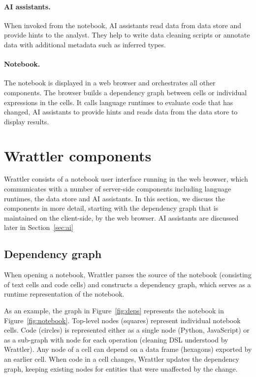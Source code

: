 \documentclass[sigplan,preprint,10pt]{acmart}\settopmatter{printfolios=true,printccs=false,printacmref=false}
\theoremstyle{plain}
\theoremstyle{definition}
\begin{document}
\paragraph{AI assistants.} When invoked from the notebook, AI assistants read data
from data store and provide hints to the analyst. They help to write data cleaning
scripts or annotate data with additional metadata such as inferred types.

\paragraph{Notebook.} The notebook is displayed in a web browser and orchestrates 
all other components. The browser builds a dependency graph between cells or individual 
expressions in the cells. It calls language runtimes to evaluate code that has changed,
AI assistants to provide hints and reads data from the data store to display results.  

\section{Wrattler components}
\label{sec:wrattler}

Wrattler consists of a notebook user interface running in the web browser, which communicates with 
a number of server-side components including language runtimes, the data store and AI assistants. 
In this section, we discuss the components in more detail, starting with the dependency graph
that is maintained on the client-side, by the web browser. AI assistants are discussed later
in Section~\ref{sec:ai}

\subsection{Dependency graph}

When opening a notebook, Wrattler parses the source of the notebook (consisting of text cells and 
code cells) and constructs a dependency graph, which serves as a runtime representation of the
notebook. 

As an example, the graph in Figure~\ref{fig:deps} represents the notebook in Figure~\ref{fig:notebook}.
Top-level nodes (squares) represent individual notebook cells. Code (circles) is represented either as 
a single node (Python, JavaScript) or as a sub-graph with node for each operation (cleaning DSL 
understood by Wrattler). Any node of a cell can depend on a data frame (hexagons) exported by an 
earlier cell. When code in a cell changes, Wrattler updates the dependency graph, keeping existing
nodes for entities that were unaffected by the change. 
\end{document}
